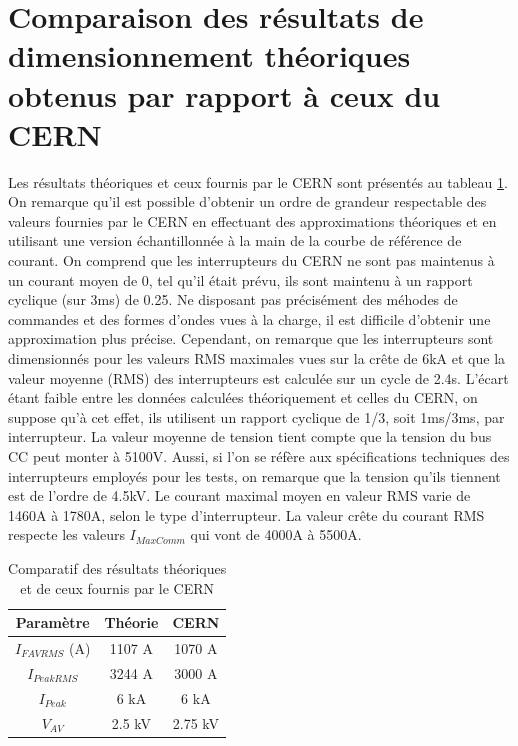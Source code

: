 \section{Comparaison des résultats de dimensionnement théoriques obtenus par rapport à ceux du CERN}
Les résultats théoriques et ceux fournis par le CERN sont présentés au tableau \ref{tab_comp_1}. On remarque qu'il est possible d'obtenir un ordre de grandeur respectable des valeurs fournies par le CERN en effectuant des approximations théoriques et en utilisant une version échantillonnée à la main de la courbe de référence de courant. On comprend que les interrupteurs du CERN ne sont pas maintenus à un courant moyen de 0, tel qu'il était prévu, ils sont maintenu à un rapport cyclique (sur 3ms) de 0.25. Ne disposant pas précisément des méhodes de commandes et des formes d'ondes vues à la charge, il est difficile d'obtenir une approximation plus précise. Cependant, on remarque que les interrupteurs sont dimensionnés pour les valeurs RMS maximales vues sur la crête de 6kA et que la valeur moyenne (RMS) des interrupteurs est calculée sur un cycle de 2.4s. L'écart étant faible entre les données calculées théoriquement et celles du CERN, on suppose qu'à cet effet, ils utilisent un rapport cyclique de 1/3, soit 1ms/3ms, par interrupteur. La valeur moyenne de tension tient compte que la tension du bus CC peut monter à 5100V. Aussi, si l'on se réfère aux spécifications techniques des interrupteurs employés pour les tests, on remarque que la tension qu'ils tiennent est de l'ordre de 4.5kV. Le courant maximal moyen en valeur RMS varie de 1460A à 1780A, selon le type d'interrupteur. La valeur crête du courant RMS respecte les valeurs $I_{MaxComm}$ qui vont de 4000A à 5500A.

\begin{table}[htb]
\centering
\begin{tabular}{ |c|c|c| }
\hline
  Paramètre & Théorie & CERN\\\hline\hline
  $I_{FAVRMS}$ (A) & 1107 A & 1070 A \\\hline
  $I_{PeakRMS}$ & 3244 A & 3000 A \\\hline
  $I_{Peak}$ & 6 kA & 6 kA \\\hline
  $V_{AV}$ & 2.5 kV & 2.75 kV \\\hline
\end{tabular}
\caption{Comparatif des résultats théoriques et de ceux fournis par le CERN}
\label{tab_comp_1}
\end{table}